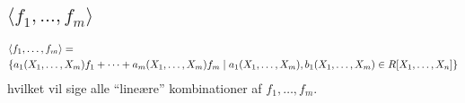 \subsection{$\langle f_1, \ldots, f_m \rangle$}
\label{f_1..f_m}
\begin{align*}
  &\langle f_1, \ldots, f_m \rangle =\\
  &\{ a_1(X_1,\ldots,X_m)f_1 + \cdots + a_m(X_1,\ldots,X_m)f_m \mid
  a_1(X_1,\ldots,X_m), b_1(X_1,\ldots,X_m) \in R[X_1,\ldots,X_n] \}
\end{align*}
hvilket vil sige alle ``lineære'' kombinationer af $f_1, \ldots, f_m$.